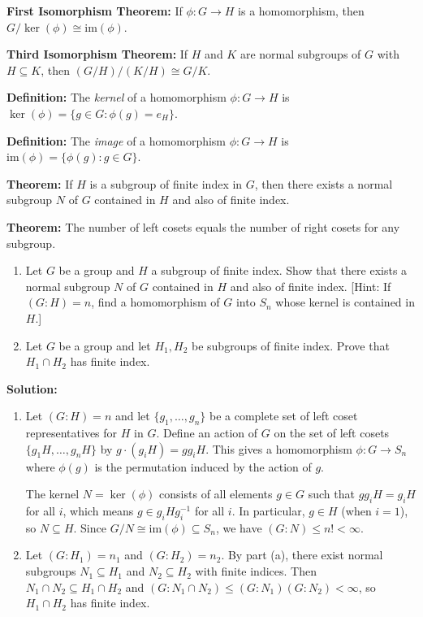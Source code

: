 \textbf{First Isomorphism Theorem:} If $\phi: G \to H$ is a homomorphism, then $G/\ker(\phi) \cong \text{im}(\phi)$.

\textbf{Third Isomorphism Theorem:} If $H$ and $K$ are normal subgroups of $G$ with $H \subseteq K$, then $(G/H)/(K/H) \cong G/K$.

\textbf{Definition:} The \textit{kernel} of a homomorphism $\phi: G \to H$ is $\ker(\phi) = \{g \in G : \phi(g) = e_H\}$.

\textbf{Definition:} The \textit{image} of a homomorphism $\phi: G \to H$ is $\text{im}(\phi) = \{\phi(g) : g \in G\}$.

\textbf{Theorem:} If $H$ is a subgroup of finite index in $G$, then there exists a normal subgroup $N$ of $G$ contained in $H$ and also of finite index.

\textbf{Theorem:} The number of left cosets equals the number of right cosets for any subgroup.

\begin{problembox}
\begin{enumerate}[label=(\alph*)]
\item Let $G$ be a group and $H$ a subgroup of finite index. Show that there exists a normal subgroup $N$ of $G$ contained in $H$ and also of finite index. [Hint: If $(G : H) = n$, find a homomorphism of $G$ into $S_n$ whose kernel is contained in $H$.]
\item Let $G$ be a group and let $H_1, H_2$ be subgroups of finite index. Prove that $H_1 \cap H_2$ has finite index.
\end{enumerate}
\end{problembox}

\noindent\textbf{Solution:}
\begin{enumerate}[label=(\alph*)]
\item Let $(G : H) = n$ and let $\{g_1, \ldots, g_n\}$ be a complete set of left coset representatives for $H$ in $G$. Define an action of $G$ on the set of left cosets $\{g_1H, \ldots, g_nH\}$ by $g \cdot (g_iH) = gg_iH$. This gives a homomorphism $\phi: G \to S_n$ where $\phi(g)$ is the permutation induced by the action of $g$.

The kernel $N = \ker(\phi)$ consists of all elements $g \in G$ such that $gg_iH = g_iH$ for all $i$, which means $g \in g_iHg_i^{-1}$ for all $i$. In particular, $g \in H$ (when $i = 1$), so $N \subseteq H$. Since $G/N \cong \text{im}(\phi) \subseteq S_n$, we have $(G : N) \leq n! < \infty$.

\item Let $(G : H_1) = n_1$ and $(G : H_2) = n_2$. By part (a), there exist normal subgroups $N_1 \subseteq H_1$ and $N_2 \subseteq H_2$ with finite indices. Then $N_1 \cap N_2 \subseteq H_1 \cap H_2$ and $(G : N_1 \cap N_2) \leq (G : N_1)(G : N_2) < \infty$, so $H_1 \cap H_2$ has finite index.
\end{enumerate}


